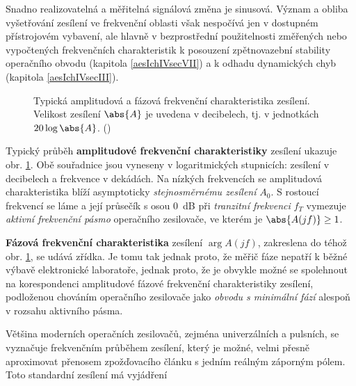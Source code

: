         Snadno realizovatelná a měřitelná signálová změna je sinusová. Význam a obliba vyšetřování
        zesílení ve frekvenční oblasti však nespočívá jen v dostupném přístrojovém vybavení, ale
        hlavně v bezprostřední použitelnosti změřených nebo vypočtených frekvenčních charakteristik
        k posouzení zpětnovazební stability operačního obvodu (kapitola \ref{aesIchIVsecVII}) a k
        odhadu dynamických chyb (kapitola \ref{aesIchIVsecIII}).

        \begin{figure}[ht!] %
          \centering
          \caption{Typická amplitudová a fázová frekvenční charakteristika zesílení. Velikost
                  zesílení \(\abs{A}\) je uvedena v decibelech, tj. v jednotkách \(20\log\abs{A}\).
                  (\cite[s.~24]{Dostal})}
          \label{aes:fig052}
        \end{figure}

        Typický průběh \textbf{amplitudové frekvenční charakteristiky} zesílení  ukazuje
        obr. \ref{aes:fig052}. Obě souřadnice jsou vyneseny v logaritmických stupnicích: zesílení v
        decibelech a frekvence v dekádách. Na nízkých frekvencích se amplitudová charakteristika
        blíží asymptoticky \emph{stejnosměrnému zesílení} \(A_0\). S rostoucí frekvencí se láme a
        její průsečík s osou \qty{0}{\dB} při \emph{tranzitní frekvenci} \(f_T\) vymezuje
        \emph{aktivní frekvenční pásmo} operačního zesilovače, ve kterém je \(\abs{A(jf)} \geq1\).

        \textbf{Fázová frekvenční charakteristika} zesílení \(\arg{A(jf)}\), zakreslena do téhož
        obr. \ref{aes:fig052}, se udává zřídka. Je tomu tak jednak proto, že měřič fáze nepatří k
        běžné výbavě elektronické laboratoře, jednak proto, že je obvykle možné se spolehnout na
        korespondenci amplitudové fázové frekvenční charakteristiky zesílení, podloženou chováním
        operačního zesilovače jako \emph{obvodu s minimální fází} alespoň v rozsahu aktivního pásma.

        Většina moderních operačních zesilovačů, zejména univerzálních a pulsních, se vyznačuje
        frekvenčním průběhem zesílení, který je možné, velmi přesně aproximovat přenosem
        zpožďovacího článku s jedním reálným záporným pólem. Toto standardní zesílení má vyjádření

